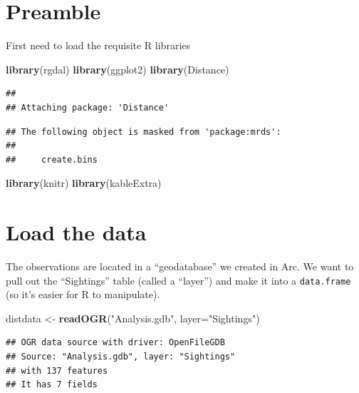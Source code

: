 \documentclass[]{book}
\newenvironment{Shaded}{\begin{snugshade}}{\end{snugshade}}
\newcommand{\KeywordTok}[1]{\textcolor[rgb]{0.13,0.29,0.53}{\textbf{#1}}}
\newcommand{\DataTypeTok}[1]{\textcolor[rgb]{0.13,0.29,0.53}{#1}}
\newcommand{\StringTok}[1]{\textcolor[rgb]{0.31,0.60,0.02}{#1}}
\newcommand{\NormalTok}[1]{#1}
\theoremstyle{definition}
\theoremstyle{definition}
\theoremstyle{remark}
\begin{document}
\section{Preamble}\label{preamble-1}

First need to load the requisite R libraries

\begin{Shaded}
\begin{Highlighting}[]
\KeywordTok{library}\NormalTok{(rgdal)}
\KeywordTok{library}\NormalTok{(ggplot2)}
\KeywordTok{library}\NormalTok{(Distance)}
\end{Highlighting}
\end{Shaded}

\begin{verbatim}
## 
## Attaching package: 'Distance'
\end{verbatim}

\begin{verbatim}
## The following object is masked from 'package:mrds':
## 
##     create.bins
\end{verbatim}

\begin{Shaded}
\begin{Highlighting}[]
\KeywordTok{library}\NormalTok{(knitr)}
\KeywordTok{library}\NormalTok{(kableExtra)}
\end{Highlighting}
\end{Shaded}

\section{Load the data}\label{load-the-data}

The observations are located in a ``geodatabase'' we created in Arc. We
want to pull out the ``Sightings'' table (called a ``layer'') and make
it into a \texttt{data.frame} (so it's easier for R to manipulate).

\begin{Shaded}
\begin{Highlighting}[]
\NormalTok{distdata <-}\StringTok{ }\KeywordTok{readOGR}\NormalTok{(}\StringTok{"Analysis.gdb"}\NormalTok{, }\DataTypeTok{layer=}\StringTok{"Sightings"}\NormalTok{)}
\end{Highlighting}
\end{Shaded}

\begin{verbatim}
## OGR data source with driver: OpenFileGDB 
## Source: "Analysis.gdb", layer: "Sightings"
## with 137 features
## It has 7 fields
\end{verbatim}
\end{document}
